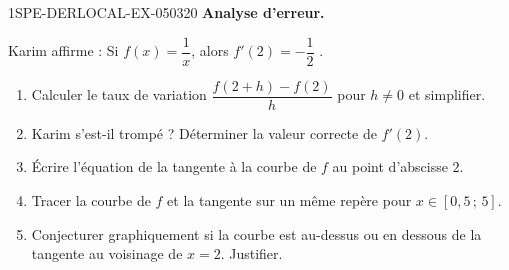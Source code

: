 \begin{exercice}{1SPE-DERLOCAL-EX-050}{3}{20}
\textbf{Analyse d'erreur.}

Karim affirme : \og Si $f(x) = \dfrac{1}{x}$, alors $f'(2) = -\dfrac{1}{2}$ \fg.

\begin{enumerate}
  \item Calculer le taux de variation $\dfrac{f(2+h) - f(2)}{h}$ pour $h
\neq 0$ et simplifier.
  \item Karim s'est-il trompé ? Déterminer la valeur correcte de $f'(2)$.
  \item Écrire l'équation de la tangente à la courbe de $f$ au point d'abscisse $2$.
  \item Tracer la courbe de $f$ et la tangente sur un même repère pour $x \in [0{,}5\,;\,5]$.
  \item Conjecturer graphiquement si la courbe est au-dessus ou en dessous de la tangente au voisinage de $x = 2$. Justifier.
\end{enumerate}
\end{exercice}
